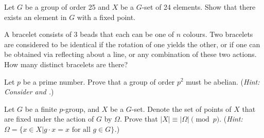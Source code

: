 \begin{problem}
    Let $G$ be a group of order 25 and $X$ be a $G$-set of 24 elements. Show that there exists an element in $G$ with a fixed point.
\end{problem}

\begin{problem}
    A bracelet consists of 3 beads that each can be one of $n$ colours. Two bracelets are considered to be identical if the rotation of one yields the other, or if one can be obtained via reflecting about a line, or any combination of these two actions. How many distinct bracelets are there?
\end{problem}

\begin{problem}\label{problem-group-of-order-prime-squared-is-abelian}
    Let $p$ be a prime number. Prove that a group of order $p^2$ must be abelian.\newline
    (\textit{Hint: Consider  and .})
\end{problem}

\begin{problem}
    Let $G$ be a finite $p$-group, and $X$ be a $G$-set. Denote the set of points of $X$ that are fixed under the action of $G$ by $\Omega$. Prove that $|X| \equiv |\Omega| \pmod p$.\newline
    (\textit{Hint: $\Omega = \{x \in X \vert g\cdot x = x \textrm{ for all } g \in G\}$.})
\end{problem}
